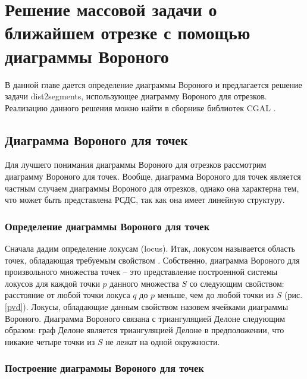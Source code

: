 \chapter{Решение массовой задачи о ближайшем отрезке с помощью диаграммы Вороного}
\label{chapSVD}

В данной главе дается определение диаграммы Вороного и предлагается
решение задачи dist2segments, использующее диаграмму Вороного для
отрезков. Реализацию данного решения можно найти в сборнике библиотек
CGAL \cite{CGAL}.

\FloatBarrier
\section{Диаграмма Вороного для точек}

Для лучшего понимания диаграммы Вороного для отрезков рассмотрим
диаграмму Вороного для точек. Вообще, диаграмма Вороного для точек
является частным случаем диаграммы
Вороного для отрезков, однако она
характерна тем, что может быть представлена РСДС, так как она имеет
линейную структуру.

\FloatBarrier
\subsection{Определение диаграммы Вороного для точек}

Сначала дадим определение локусам (locus). Итак, локусом называется
область точек, обладающая требуемым свойством \cite{PrSh}. Собственно, диаграмма
Вороного для произвольного множества точек -- это представление
построенной системы локусов для каждой точки $p$ данного множества $S$ со
следующим свойством: расстояние от любой точки локуса $q$ до $p$ меньше, чем
до любой точки из $S$ (рис. \ref{pvd}). Локусы, обладающие данным
свойством назовем ячейками диаграммы Вороного.
Диаграмма Вороного связана с триангуляцией Делоне \cite{PrSh, CGAL} следующим
образом: граф Делоне является триангуляцией Делоне в предположении, что
никакие четыре точки из $S$ не лежат на одной окружности.


\FloatBarrier
\subsection{Построение диаграммы Вороного для точек}

